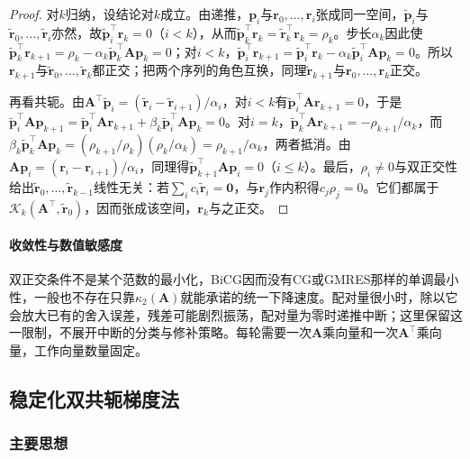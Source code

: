 \begin{proof}
对$k$归纳，设结论对$k$成立。由递推，$\bm p_i$与$\bm r_0,\ldots,\bm r_i$张成同一空间，$\widetilde{\bm p}_i$与$\widetilde{\bm r}_0,\ldots,\widetilde{\bm r}_i$亦然，故$\widetilde{\bm p}_i^\top\bm r_k=0$（$i<k$），从而$\widetilde{\bm p}_k^\top\bm r_k=\widetilde{\bm r}_k^\top\bm r_k=\rho_k$。步长$\alpha_k$因此使$\widetilde{\bm p}_k^\top\bm r_{k+1}=\rho_k-\alpha_k\widetilde{\bm p}_k^\top\bm A\bm p_k=0$；对$i<k$，$\widetilde{\bm p}_i^\top\bm r_{k+1}=\widetilde{\bm p}_i^\top\bm r_k-\alpha_k\widetilde{\bm p}_i^\top\bm A\bm p_k=0$。所以$\bm r_{k+1}$与$\widetilde{\bm r}_0,\ldots,\widetilde{\bm r}_k$都正交；把两个序列的角色互换，同理$\widetilde{\bm r}_{k+1}$与$\bm r_0,\ldots,\bm r_k$正交。

再看共轭。由$\bm A^\top\widetilde{\bm p}_i=(\widetilde{\bm r}_i-\widetilde{\bm r}_{i+1})/\alpha_i$，对$i<k$有$\widetilde{\bm p}_i^\top\bm A\bm r_{k+1}=0$，于是$\widetilde{\bm p}_i^\top\bm A\bm p_{k+1}=\widetilde{\bm p}_i^\top\bm A\bm r_{k+1}+\beta_k\widetilde{\bm p}_i^\top\bm A\bm p_k=0$。对$i=k$，$\widetilde{\bm p}_k^\top\bm A\bm r_{k+1}=-\rho_{k+1}/\alpha_k$，而$\beta_k\widetilde{\bm p}_k^\top\bm A\bm p_k=(\rho_{k+1}/\rho_k)(\rho_k/\alpha_k)=\rho_{k+1}/\alpha_k$，两者抵消。由$\bm A\bm p_i=(\bm r_i-\bm r_{i+1})/\alpha_i$，同理得$\widetilde{\bm p}_{k+1}^\top\bm A\bm p_i=0$（$i\le k$）。最后，$\rho_i\ne0$与双正交性给出$\widetilde{\bm r}_0,\ldots,\widetilde{\bm r}_{k-1}$线性无关：若$\sum_ic_i\widetilde{\bm r}_i=\bm 0$，与$\bm r_j$作内积得$c_j\rho_j=0$。它们都属于$\mathcal K_k(\bm A^\top,\widetilde{\bm r}_0)$，因而张成该空间，$\bm r_k$与之正交。
\end{proof}

\paragraph{收敛性与数值敏感度}
双正交条件不是某个范数的最小化，BiCG因而没有CG或GMRES那样的单调最小性，一般也不存在只靠$\kappa_2(\bm A)$就能承诺的统一下降速度。配对量很小时，除以它会放大已有的舍入误差，残差可能剧烈振荡，配对量为零时递推中断；这里保留这一限制，不展开中断的分类与修补策略。每轮需要一次$\bm A$乘向量和一次$\bm A^\top$乘向量，工作向量数量固定。

\subsection{稳定化双共轭梯度法}
\label{sec:ls-bicgstab}

\subsubsection{主要思想}

